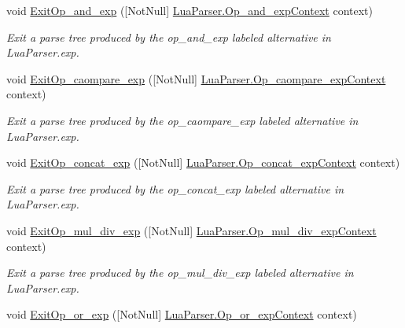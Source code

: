 \begin{DoxyCompactItemize}
void \mbox{\hyperlink{classzlua_1_1_compiler_a51cc2b5c59894178b1afdeb578997e83}{Exit\+Op\+\_\+and\+\_\+exp}} (\mbox{[}Not\+Null\mbox{]} \mbox{\hyperlink{classzlua_1_1_lua_parser_1_1_op__and__exp_context}{Lua\+Parser.\+Op\+\_\+and\+\_\+exp\+Context}} context)
\begin{DoxyCompactList}\small\item\em Exit a parse tree produced by the {\ttfamily op\+\_\+and\+\_\+exp} labeled alternative in Lua\+Parser.\+exp. \end{DoxyCompactList}\item 
void \mbox{\hyperlink{classzlua_1_1_compiler_ad8d4d6cd82a6a48264848b8d6f88dae2}{Exit\+Op\+\_\+caompare\+\_\+exp}} (\mbox{[}Not\+Null\mbox{]} \mbox{\hyperlink{classzlua_1_1_lua_parser_1_1_op__caompare__exp_context}{Lua\+Parser.\+Op\+\_\+caompare\+\_\+exp\+Context}} context)
\begin{DoxyCompactList}\small\item\em Exit a parse tree produced by the {\ttfamily op\+\_\+caompare\+\_\+exp} labeled alternative in Lua\+Parser.\+exp. \end{DoxyCompactList}\item 
void \mbox{\hyperlink{classzlua_1_1_compiler_ac935829de2864ba1352061c546d1c74a}{Exit\+Op\+\_\+concat\+\_\+exp}} (\mbox{[}Not\+Null\mbox{]} \mbox{\hyperlink{classzlua_1_1_lua_parser_1_1_op__concat__exp_context}{Lua\+Parser.\+Op\+\_\+concat\+\_\+exp\+Context}} context)
\begin{DoxyCompactList}\small\item\em Exit a parse tree produced by the {\ttfamily op\+\_\+concat\+\_\+exp} labeled alternative in Lua\+Parser.\+exp. \end{DoxyCompactList}\item 
void \mbox{\hyperlink{classzlua_1_1_compiler_a970ec54bed0c80f053b68a8dcff3a245}{Exit\+Op\+\_\+mul\+\_\+div\+\_\+exp}} (\mbox{[}Not\+Null\mbox{]} \mbox{\hyperlink{classzlua_1_1_lua_parser_1_1_op__mul__div__exp_context}{Lua\+Parser.\+Op\+\_\+mul\+\_\+div\+\_\+exp\+Context}} context)
\begin{DoxyCompactList}\small\item\em Exit a parse tree produced by the {\ttfamily op\+\_\+mul\+\_\+div\+\_\+exp} labeled alternative in Lua\+Parser.\+exp. \end{DoxyCompactList}\item 
void \mbox{\hyperlink{classzlua_1_1_compiler_a64367a7cac1636be85228c39a80b0ae7}{Exit\+Op\+\_\+or\+\_\+exp}} (\mbox{[}Not\+Null\mbox{]} \mbox{\hyperlink{classzlua_1_1_lua_parser_1_1_op__or__exp_context}{Lua\+Parser.\+Op\+\_\+or\+\_\+exp\+Context}} context)

\end{DoxyCompactItemize}
